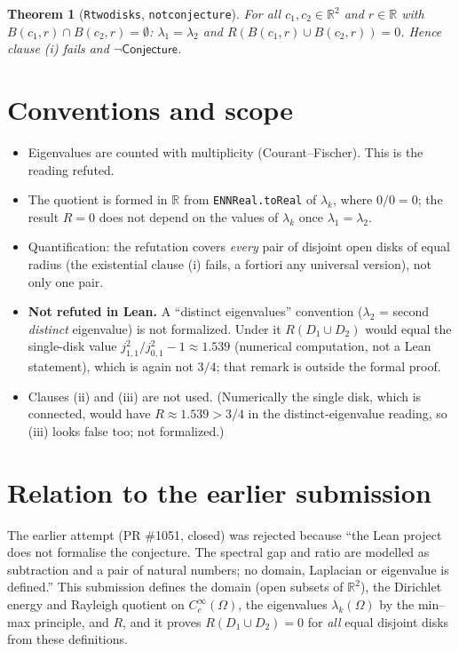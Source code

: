 \documentclass[11pt]{article}
\renewcommand{\_}{\oldus\allowbreak}
\newtheorem{theorem}{Theorem}
\theoremstyle{definition}
\theoremstyle{remark}
\begin{document}
\begin{theorem}[\texttt{R\_two\_disks}, \texttt{not\_conjecture}]
For all $c_1,c_2\in\mathbb R^2$ and $r\in\mathbb R$ with $B(c_1,r)\cap B(c_2,r)=\emptyset$:
$\lambda_1=\lambda_2$ and $R(B(c_1,r)\cup B(c_2,r))=0$. Hence clause (i) fails and $\neg\textsf{Conjecture}$.
\end{theorem}

\section{Conventions and scope}

\begin{itemize}
  \item Eigenvalues are counted with multiplicity (Courant--Fischer). This is the reading refuted.
  \item The quotient is formed in $\mathbb R$ from \texttt{ENNReal.toReal} of $\lambda_k$, where $0/0=0$;
        the result $R=0$ does not depend on the values of $\lambda_k$ once $\lambda_1=\lambda_2$.
  \item Quantification: the refutation covers \emph{every} pair of disjoint open disks of equal radius (the
        existential clause (i) fails, a fortiori any universal version), not only one pair.
  \item \textbf{Not refuted in Lean.} A ``distinct eigenvalues'' convention ($\lambda_2$ = second \emph{distinct}
        eigenvalue) is not formalized. Under it $R(D_1\cup D_2)$ would equal the single-disk value
        $j_{1,1}^2/j_{0,1}^2-1\approx1.539$ (numerical computation, not a Lean statement), which is again
        not $3/4$; that remark is outside the formal proof.
  \item Clauses (ii) and (iii) are not used. (Numerically the single disk, which is connected, would have
        $R\approx1.539>3/4$ in the distinct-eigenvalue reading, so (iii) looks false too; not formalized.)
\end{itemize}

\section{Relation to the earlier submission}

The earlier attempt (PR \#1051, closed) was rejected because ``the Lean project does not formalise the
conjecture. The spectral gap and ratio are modelled as subtraction and a pair of natural numbers; no domain,
Laplacian or eigenvalue is defined.'' This submission defines the domain (open subsets of $\mathbb R^2$), the
Dirichlet energy and Rayleigh quotient on $C_c^\infty(\Omega)$, the eigenvalues $\lambda_k(\Omega)$ by the
min--max principle, and $R$, and it proves $R(D_1\cup D_2)=0$ for \emph{all} equal disjoint disks from these
definitions.
\end{document}
